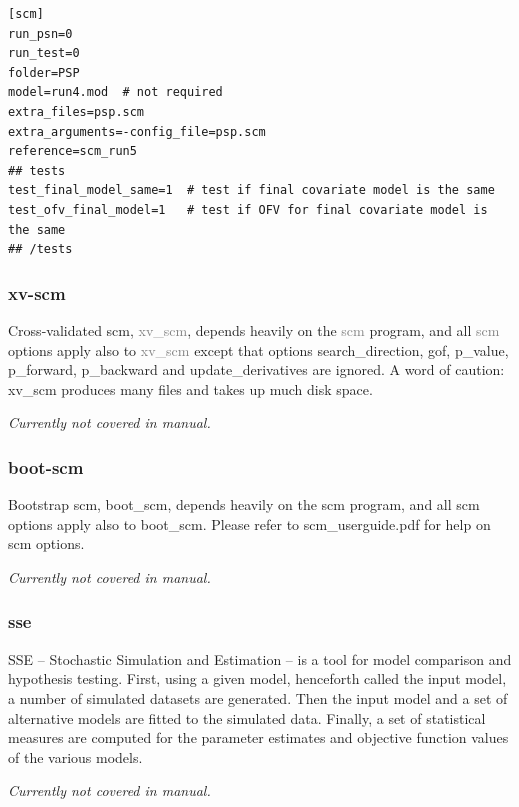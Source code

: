 \documentclass[a4,11pt]{report} \usepackage[pdftex]{graphicx}
\newcommand{\psn}[1]{\textcolor{Grey}{#1}}
\begin{document}
\begin{lstlisting}
[scm]
run_psn=0
run_test=0
folder=PSP
model=run4.mod  # not required
extra_files=psp.scm
extra_arguments=-config_file=psp.scm
reference=scm_run5
## tests
test_final_model_same=1  # test if final covariate model is the same
test_ofv_final_model=1   # test if OFV for final covariate model is
the same
## /tests
\end{lstlisting}

\subsubsection{xv-scm}
Cross-validated scm, \psn{xv\_scm}, depends heavily on the \psn{scm} program, and
all \psn{scm} options apply also to \psn{xv\_scm} except that options
search\_direction, gof, p\_value, p\_forward, p\_backward and
update\_derivatives are ignored. A word of caution: xv\_scm produces
many files and takes up much disk space. 

\vspace{10pt}

\noindent \textit{Currently not covered in manual.}

\subsubsection{boot-scm}
Bootstrap scm, boot\_scm, depends heavily on the scm program, and all
scm options apply also to boot\_scm. Please refer to
scm\_userguide.pdf for help on scm options.

\vspace{10pt}

\noindent \textit{Currently not covered in manual.}

\subsubsection{sse}
SSE – Stochastic Simulation and Estimation – is a tool for model comparison and hypothesis testing.
First, using a given model, henceforth called the input model, a number of simulated datasets are
generated. Then the input model and a set of alternative models are fitted to the simulated data. Finally,
a set of statistical measures are computed for the parameter estimates and objective function values of
the various models.

\vspace{10pt}

\noindent \textit{Currently not covered in manual.}
\end{document}
